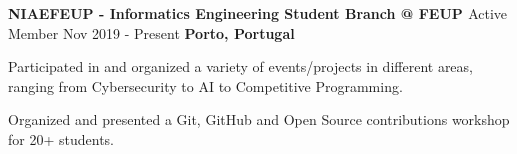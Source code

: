 \begin{cventries}
  \cventry
     {\textbf{NIAEFEUP - Informatics Engineering Student Branch @ FEUP \href{https://ni.fe.up.pt/}{\faExternalLink}}} %
    {Active Member} %
    {Nov 2019 - Present} %
    {\textbf{Porto, Portugal}} %
    {
      \begin{cvitems} %
        \item {Participated in and organized a variety of events/projects in different areas, ranging from Cybersecurity to AI to Competitive Programming.}
        \item {Organized and presented a Git, GitHub and Open Source contributions workshop for 20+ students.}
      \end{cvitems}
    }

\end{cventries}
